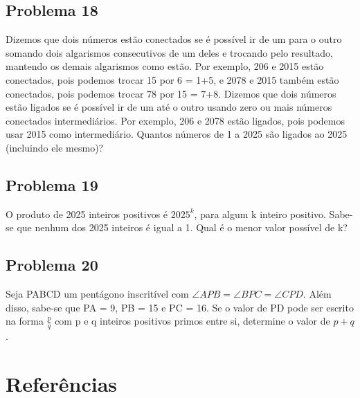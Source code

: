 \documentclass[12pt]{article}
\begin{document}
\clearpage

\subsection{Problema 18}
\begin{tcolorbox}[statementbox]
Dizemos que dois números estão conectados se é possível ir de um para o outro somando dois algarismos consecutivos de um deles e trocando pelo resultado, mantendo
os demais algarismos como estão. Por exemplo, 206 e 2015 estão conectados, pois podemos trocar 15 por 6 = 1+5, e 2078 e 2015 também estão conectados, pois podemos trocar
78 por 15 = 7+8. Dizemos que dois números estão ligados se é possível ir de um até o outro usando zero ou mais números conectados intermediários. Por exemplo, 206 e 2078
estão ligados, pois podemos usar 2015 como intermediário. Quantos números de 1 a 2025 são ligados ao 2025 (incluindo ele mesmo)?
\end{tcolorbox}

\clearpage

\subsection{Problema 19}
\begin{tcolorbox}[statementbox]
O produto de 2025 inteiros positivos é \(2025^k\), para algum k inteiro positivo. Sabe-se que nenhum dos 2025 inteiros é igual a 1. Qual é o menor valor possível de k?
\end{tcolorbox}

\clearpage

\subsection{Problema 20}
\begin{tcolorbox}[statementbox]
Seja PABCD um pentágono inscritível com \(\angle APB = \angle BPC = \angle CPD\). Além disso, sabe-se que PA = 9, PB = 15 e PC = 16. Se o valor de PD pode ser escrito
na forma \(\tfrac{p}{q}\) com p e q inteiros positivos primos entre si, determine o valor de \(p+q\).
\end{tcolorbox}


  \clearpage

  \section{\textsf{Referências}}
\end{document}
